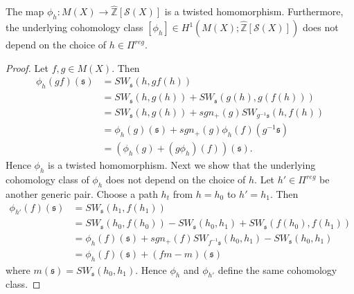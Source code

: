 \documentclass[10pt,a4paper]{amsart}
\begin{document}
\begin{proposition}\label{prop:cocyc}
The map $\phi_h : M(X) \to \widehat{\mathbb{Z}}[\mathcal{S}(X)]$ is a twisted homomorphism. Furthermore, the underlying cohomology class $[\phi_h] \in H^1( M(X) ; \widehat{\mathbb{Z}}[\mathcal{S}(X)])$ does not depend on the choice of $h \in \Pi^{reg}$.
\end{proposition}

\begin{proof}
Let $f,g \in M(X)$. Then
\begin{align*}
\phi_h(gf)(\mathfrak{s}) &= SW_{\mathfrak{s}}( h , gf(h) ) \\
&= SW_{\mathfrak{s}}(h , g(h) ) + SW_{\mathfrak{s}}( g(h) , g(f(h)) ) \\
&= SW_{\mathfrak{s}}(h , g(h) ) + sgn_+(g) SW_{ g^{-1}\mathfrak{s}}( h , f(h) ) \\
&= \phi_h(g)(\mathfrak{s}) + sgn_+(g)\phi_h(f)( g^{-1}\mathfrak{s} ) \\
&= ( \phi_h(g) + (g\phi_h)(f) )(\mathfrak{s}).
\end{align*}
Hence $\phi_h$ is a twisted homomorphism. Next we show that the underlying cohomology class of $\phi_h$ does not depend on the choice of $h$. Let $h' \in \Pi^{reg}$ be another generic pair. Choose a path $h_t$ from $h = h_0$ to $h' = h_1$. Then
\begin{align*}
\phi_{h'}(f)(\mathfrak{s}) &= SW_{\mathfrak{s}}( h_1 , f(h_1) ) \\
&= SW_{\mathfrak{s}}( h_0 , f(h_0) ) - SW_{\mathfrak{s}}(h_0 , h_1) + SW_{\mathfrak{s}}( f(h_0) , f(h_1) ) \\
&= \phi_h(f)(\mathfrak{s}) + sgn_+(f) SW_{f^{-1}\mathfrak{s}}( h_0 , h_1 ) - SW_{\mathfrak{s}}(h_0 , h_1) \\
&= \phi_h(f)(\mathfrak{s}) + (fm-m)(\mathfrak{s})
\end{align*}
where $m(\mathfrak{s}) = SW_{\mathfrak{s}}( h_0 , h_1 )$. Hence $\phi_h$ and $\phi_{h'}$ define the same cohomology class.
\end{proof}
\end{document}
